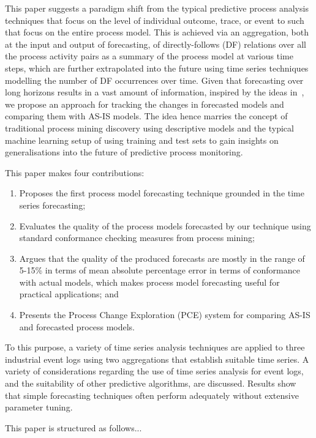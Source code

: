 This paper suggests a paradigm shift from the typical predictive process analysis techniques that focus on the level of individual outcome, trace, or event to such that focus on the entire process model.
This is achieved via an aggregation, both at the input and output of forecasting, of directly-follows (DF) relations over all the process activity pairs as a summary of the process model at various time steps, which are further extrapolated into the future using time series techniques modelling the number of DF occurrences over time.
Given that forecasting over long horizons results in a vast amount of information, inspired by the ideas in~\cite{DBLP:conf/er/KabicherKR11}, we propose an approach for tracking the changes in forecasted models and comparing them with AS-IS models.
The idea hence marries the concept of traditional process mining discovery using descriptive models and the typical machine learning setup of using training and test sets to gain insights on generalisations into the future of predictive process monitoring.

This paper makes four contributions:
\begin{enumerate}
	\item Proposes the first process model forecasting technique grounded in the time series forecasting;
	\item Evaluates the quality of the process models forecasted by our technique using standard conformance checking measures from process mining;
	\item Argues that the quality of the produced forecasts are mostly in the range of 5-15\% in terms of mean absolute percentage error in terms of conformance with actual models, which makes process model forecasting useful for practical applications; and
	\item Presents the Process Change Exploration (PCE) system for comparing AS-IS and forecasted process models.
\end{enumerate}

To this purpose, a variety of time series analysis techniques are applied to three industrial event logs using two aggregations that establish suitable time series. 
A variety of considerations regarding the use of time series analysis for event logs, and the suitability of other predictive algorithms, are discussed.
Results show that simple forecasting techniques often perform adequately without extensive parameter tuning. 

This paper is structured as follows...